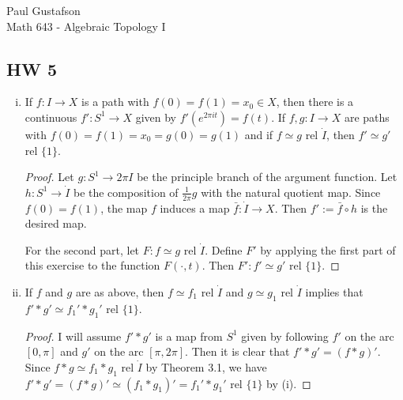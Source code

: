 \documentclass{article}
\begin{document}
\noindent Paul Gustafson\\
\noindent Math 643 - Algebraic Topology I

\subsection*{HW 5}
 \begin{enumerate}[(i)]
\item If $f: I \to X$ is a path with $f(0) = f(1) = x_0 \in X$, then there is a continuous 
$f': S^1 \to X$ given by $f'(e^{2\pi i t}) = f(t)$. If $f, g : I \to X$ are paths with $f(0) = 
f(1) = x_0 = g(0) = g(1)$ and if $f \simeq g$ rel $\dot I$, then $f' \simeq g'$ rel $\{1\}$.

\begin{proof}
Let $g: S^1 \to 2 \pi I$ be the principle branch of the argument function.  Let $h: S^1 \to \dot I$ be
 the composition of $\frac 1 {2\pi} g$ with the natural quotient 
map.  Since $f(0) = f(1)$, the map $f$ induces a map $\bar f: \dot I \to X$.
Then $f' := \bar f \circ h$ is the desired map.

For the second part, let $F: f \simeq g$ rel $\dot I$. Define $F'$ by applying the first part of this
exercise to the function $F(\cdot, t)$. Then $F': f' \simeq g'$ rel $\{1\}$. 
\end{proof}

\item If $f$ and $g$ are as above, then $f \simeq f_1$ rel $\dot I$ and $g \simeq g_1$ rel $\dot I$ 
implies that $f' * g' \simeq f_1' * g_1'$ rel $\{1\}$.
\begin{proof}
I will assume $f' * g'$ is a map from $S^1$ given by following $f'$ on the arc $[0, \pi]$ and $g'$ on
the arc $[\pi, 2\pi]$. Then it is clear that $f' * g' = (f * g)'$.  Since $f * g \simeq f_1 * g_1$
rel $\dot I$ by Theorem 3.1, we have $f'* g' = (f*g)' \simeq (f_1 * g_1)' = f_1' * g_1'$ rel $\{1\}$ 
by (i).
\end{proof}
\end{enumerate}
\end{document}
